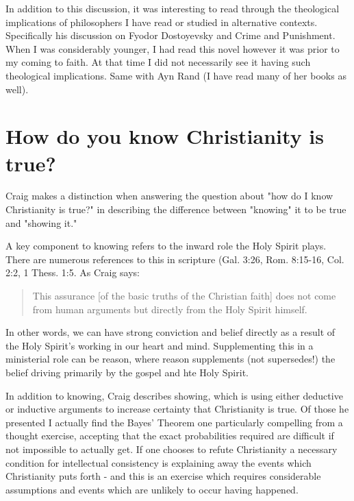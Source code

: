 \documentclass[12pt]{turabian-researchpaper}
\begin{document}
In addition to this discussion, it was interesting to read through the theological implications of philosophers I have read or studied in alternative contexts. Specifically his discussion on Fyodor Dostoyevsky\autocite[pg.68]{craig2008reasonable} and Crime and Punishment. When I was considerably younger, I had read this novel however it was prior to my coming to faith. At that time I did not necessarily see it having such theological implications. Same with Ayn Rand (I have read many of her books as well).




\section{How do you know Christianity is true?}

Craig makes a distinction when answering the question about "how do I know Christianity is true?" in describing the difference between "knowing" it to be true and "showing it."

A key component to knowing refers to the inward role the Holy Spirit plays.  There are numerous references to this in scripture (Gal. 3:26, Rom. 8:15-16, Col. 2:2, 1  Thess. 1:5. As Craig says:\autocite[pg.44]{craig2008reasonable}

\begin{quotation}
This assurance [of the basic truths of the Christian faith] does not come from human arguments but directly from the Holy Spirit himself.
\end{quotation}

In other words, we can have strong conviction and belief directly as a result of the Holy Spirit's working in our heart and mind. Supplementing this in a ministerial role can be reason, where reason supplements (not supersedes!) the belief driving primarily by the gospel and hte Holy Spirit.

In addition to knowing, Craig describes showing, which is using either deductive or inductive arguments to increase certainty that Christianity is true. Of those he presented I actually find the Bayes' Theorem one particularly compelling from a thought exercise, accepting that the exact probabilities required are difficult if not impossible to actually get. If one chooses to refute Christianity a necessary condition for intellectual consistency is explaining away the events which Christianity puts forth - and this is an exercise which requires considerable assumptions and events which are unlikely to occur having happened.
\end{document}
